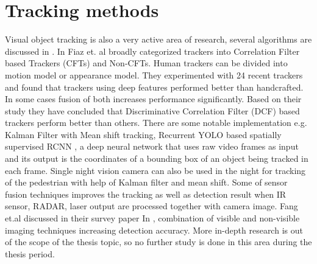 \section{Tracking methods}
Visual object tracking is also a very active area of research, several algorithms are discussed in \cite{fiaz2019handcrafted,xu2005pedestrian,ning2017spatially}.
In \cite{fiaz2019handcrafted} Fiaz et. al broadly categorized trackers into Correlation Filter based Trackers (CFTs) and Non-CFTs. Human trackers can be divided into motion model or appearance model. They experimented with 24 recent trackers and found that trackers using deep features performed better than handcrafted. In some cases fusion of both increases performance significantly. Based on their study they have concluded that Discriminative Correlation Filter (DCF) based trackers perform better than others. There are some notable implementation e.g. 
Kalman Filter with Mean shift tracking, Recurrent YOLO based spatially supervised RCNN \cite{ning2017spatially}, a deep neural network that uses raw video frames as input and its output is the coordinates of a bounding box of an object being tracked in each frame. Single night vision camera can also be used in the night for tracking of the pedestrian with help of Kalman filter and mean shift. Some of sensor fusion techniques improves the tracking as well as detection result when IR sensor, RADAR, laser output are processed together with camera image. Fang et.al discussed in their survey paper In \cite{gonzalez2016pedestrian}, combination of visible and non-visible imaging techniques increasing detection accuracy. More in-depth research is out of the scope of the thesis topic, so no further study is done in this area during the thesis period.



